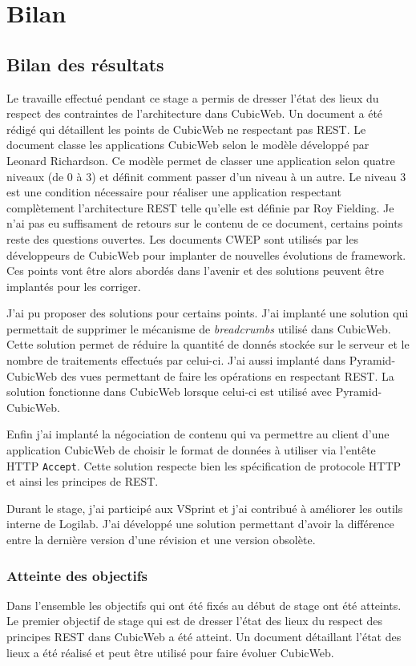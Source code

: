 \chapter{Bilan} 
\section{Bilan des résultats} 
Le travaille effectué pendant ce stage a permis de dresser l'état des lieux 
du respect des contraintes de l'architecture  dans 
CubicWeb. Un document  a été rédigé qui détaillent les 
points de CubicWeb ne respectant pas REST. Le document classe les applications 
CubicWeb selon le modèle développé par Leonard Richardson\cite{rmm}. Ce modèle 
permet de classer une application selon quatre niveaux (de 0 à 3) et définit 
comment passer d'un niveau à un autre. Le niveau 3 est une condition nécessaire 
pour réaliser une application respectant complètement l'architecture REST telle 
qu'elle est définie par Roy Fielding. Je n'ai pas eu suffisament de retours sur le 
contenu de ce document, certains points reste des questions ouvertes. Les 
documents CWEP sont utilisés par les développeurs de CubicWeb pour implanter de 
nouvelles évolutions de framework. Ces points vont être alors abordés dans 
l'avenir et des solutions peuvent être implantés pour les corriger. 

J'ai pu proposer des solutions pour certains points. J'ai implanté une solution
qui permettait de supprimer le mécanisme de \textit{breadcrumbs} utilisé dans
CubicWeb. Cette solution permet de réduire la quantité de donnés stockée sur le
serveur et le nombre de traitements effectués par celui-ci. J'ai aussi implanté
dans Pyramid-CubicWeb des vues permettant de faire les opérations
 en respectant REST. La solution fonctionne dans CubicWeb
lorsque celui-ci est utilisé avec Pyramid-CubicWeb. 

Enfin j'ai implanté la négociation de contenu qui va permettre au client d'une
application CubicWeb de choisir le format de données à utiliser via l'entête
HTTP \texttt{Accept}. Cette solution respecte bien les spécification de
protocole HTTP et ainsi les principes de REST. 

Durant le stage, j'ai participé aux VSprint et j'ai contribué à améliorer les
outils interne de Logilab. J'ai développé une solution permettant d'avoir la
différence entre la dernière version d'une révision et une version obsolète.

\subsection{Atteinte des objectifs} 
Dans l'ensemble les objectifs qui ont été fixés au début de stage ont été atteints. 
Le premier objectif de stage qui est de dresser l'état des lieux du respect des 
principes REST dans CubicWeb a été atteint. Un document détaillant l'état des lieux 
a été réalisé et peut être utilisé pour faire évoluer CubicWeb. 


